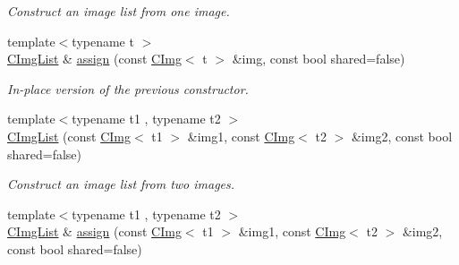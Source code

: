 \begin{DoxyCompactItemize}
\begin{DoxyCompactList}\small\item\em Construct an image list from one image. \end{DoxyCompactList}\item 
\hypertarget{structcimg__library_1_1_c_img_list_ab0468eeeca9d65e4b2e04210b650af32}{{\footnotesize template$<$typename t $>$ }\\\hyperlink{structcimg__library_1_1_c_img_list}{C\-Img\-List} \& \hyperlink{structcimg__library_1_1_c_img_list_ab0468eeeca9d65e4b2e04210b650af32}{assign} (const \hyperlink{structcimg__library_1_1_c_img}{C\-Img}$<$ t $>$ \&img, const bool shared=false)}\label{structcimg__library_1_1_c_img_list_ab0468eeeca9d65e4b2e04210b650af32}

\begin{DoxyCompactList}\small\item\em In-\/place version of the previous constructor. \end{DoxyCompactList}\item 
\hypertarget{structcimg__library_1_1_c_img_list_a74160f233f305ea2002297a72bec5dac}{{\footnotesize template$<$typename t1 , typename t2 $>$ }\\\hyperlink{structcimg__library_1_1_c_img_list_a74160f233f305ea2002297a72bec5dac}{C\-Img\-List} (const \hyperlink{structcimg__library_1_1_c_img}{C\-Img}$<$ t1 $>$ \&img1, const \hyperlink{structcimg__library_1_1_c_img}{C\-Img}$<$ t2 $>$ \&img2, const bool shared=false)}\label{structcimg__library_1_1_c_img_list_a74160f233f305ea2002297a72bec5dac}

\begin{DoxyCompactList}\small\item\em Construct an image list from two images. \end{DoxyCompactList}\item 
\hypertarget{structcimg__library_1_1_c_img_list_abd9a48a6af4a0d8aa04e32bc33432b3c}{{\footnotesize template$<$typename t1 , typename t2 $>$ }\\\hyperlink{structcimg__library_1_1_c_img_list}{C\-Img\-List} \& \hyperlink{structcimg__library_1_1_c_img_list_abd9a48a6af4a0d8aa04e32bc33432b3c}{assign} (const \hyperlink{structcimg__library_1_1_c_img}{C\-Img}$<$ t1 $>$ \&img1, const \hyperlink{structcimg__library_1_1_c_img}{C\-Img}$<$ t2 $>$ \&img2, const bool shared=false)}\label{structcimg__library_1_1_c_img_list_abd9a48a6af4a0d8aa04e32bc33432b3c}


\end{DoxyCompactItemize}
